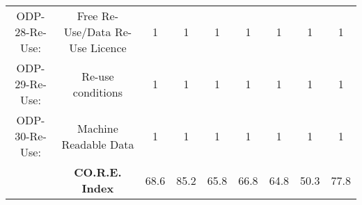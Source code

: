 \documentclass[a4paper, twoside]{report}
\begin{document}
\begin{table}[htbp]
\begin{adjustbox}{max width=\linewidth}
\begin{tabular}{rcccccccc}
    \multicolumn{1}{c}{ODP-28-Re-Use:} & \multicolumn{1}{p{19em}}{\cellcolor[rgb]{ .749,  .749,  .749}Free Re-Use/Data Re-Use Licence} & \cellcolor[rgb]{ .749,  .749,  .749}1 & \cellcolor[rgb]{ .749,  .749,  .749}1 & \cellcolor[rgb]{ .749,  .749,  .749}1 & \cellcolor[rgb]{ .749,  .749,  .749}1 & \cellcolor[rgb]{ .749,  .749,  .749}1 & \cellcolor[rgb]{ .749,  .749,  .749}1 & \cellcolor[rgb]{ .749,  .749,  .749}1 \\
    \multicolumn{1}{c}{ODP-29-Re-Use:} & \multicolumn{1}{p{19em}}{\cellcolor[rgb]{ .749,  .749,  .749}Re-use conditions} & \cellcolor[rgb]{ .749,  .749,  .749}1 & \cellcolor[rgb]{ .749,  .749,  .749}1 & \cellcolor[rgb]{ .749,  .749,  .749}1 & \cellcolor[rgb]{ .749,  .749,  .749}1 & \cellcolor[rgb]{ .749,  .749,  .749}1 & \cellcolor[rgb]{ .749,  .749,  .749}1 & \cellcolor[rgb]{ .749,  .749,  .749}1 \\
    \multicolumn{1}{c}{ODP-30-Re-Use:} & \multicolumn{1}{p{19em}}{\cellcolor[rgb]{ .749,  .749,  .749}Machine Readable Data} & \cellcolor[rgb]{ .749,  .749,  .749}1 & \cellcolor[rgb]{ .749,  .749,  .749}1 & \cellcolor[rgb]{ .749,  .749,  .749}1 & \cellcolor[rgb]{ .749,  .749,  .749}1 & \cellcolor[rgb]{ .749,  .749,  .749}1 & \cellcolor[rgb]{ .749,  .749,  .749}1 & \cellcolor[rgb]{ .749,  .749,  .749}1 \\
    \midrule
          & \textbf{CO.R.E. Index} & 68.6  & 85.2  & 65.8  & 66.8  & 64.8  & 50.3  & 77.8 \\
    \end{tabular}%
    \end{adjustbox}
  \label{tab:score_final2}%
\end{table}%
\end{document}
